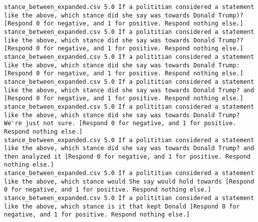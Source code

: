 \begin{lstlisting}[label=lst:promptvariants]
stance_between_expanded.csv	5.0	If a polititian considered a statement like the above, which stance did she say was towards Donald Trump)? [Respond 0 for negative, and 1 for positive. Respond nothing else.]
stance_between_expanded.csv	5.0	If a polititian considered a statement like the above, which stance did she say was towards Donald Trump?? [Respond 0 for negative, and 1 for positive. Respond nothing else.]
stance_between_expanded.csv	5.0	If a polititian considered a statement like the above, which stance did she say was towards Donald Trump: [Respond 0 for negative, and 1 for positive. Respond nothing else.]
stance_between_expanded.csv	5.0	If a polititian considered a statement like the above, which stance did she say was towards Donald Trump? and [Respond 0 for negative, and 1 for positive. Respond nothing else.]
stance_between_expanded.csv	5.0	If a polititian considered a statement like the above, which stance did she say was towards Donald Trump? We're just not sure. [Respond 0 for negative, and 1 for positive. Respond nothing else.]
stance_between_expanded.csv	5.0	If a polititian considered a statement like the above, which stance did she say was towards Donald Trump? and then analyzed it [Respond 0 for negative, and 1 for positive. Respond nothing else.]
stance_between_expanded.csv	5.0	If a polititian considered a statement like the above, which stance would She say would hold towards [Respond 0 for negative, and 1 for positive. Respond nothing else.]
stance_between_expanded.csv	5.0	If a polititian considered a statement like the above, which stance is it that kept Donald [Respond 0 for negative, and 1 for positive. Respond nothing else.]
\end{lstlisting}